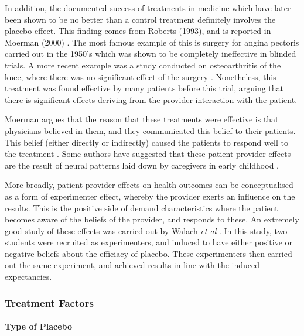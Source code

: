 In addition, the documented success of treatments in medicine which have later been shown to be no better than a control treatment definitely involves the placebo effect. This finding comes from Roberts (1993), and is reported in Moerman (2000) \cite{Moerman2000a}.  The most famous example of this is surgery for angina pectoris carried out in the 1950's which was shown to be completely ineffective in blinded trials. A more recent example was a study conducted on osteoarthritis of the knee, where there was no significant effect of the surgery \cite{horng2002placebo}. Nonetheless, this treatment was found effective by many patients before this trial, arguing that there is significant effects deriving from the provider interaction with the patient.  

Moerman argues that the reason that these treatments were effective is that physicians believed in them, and they communicated this belief to their patients. 
This belief (either directly or indirectly) caused the patients to respond well to the treatment \cite{Moerman2000}. Some authors have suggested that these patient-provider effects are the result of neural patterns laid down by caregivers in early childhood \cite{Kradin2004}.

More broadly, patient-provider effects on health outcomes can be conceptualised as a form of experimenter effect, whereby the provider exerts an influence on the results. This is the positive side of demand characteristics where the patient becomes aware of the beliefs of the provider, and responds to these. An extremely good study of these effects was carried out by Walach \textit{et al} \cite{Walach2002}. In this study, two students were recruited as experimenters, and induced to have either positive or negative beliefs about the efficiacy of placebo. These experimenters then carried out the same experiment, and achieved results in line with the induced expectancies. 


\subsubsection{Treatment Factors}

\paragraph{Type of Placebo}
\label{sec:type-placebo}

